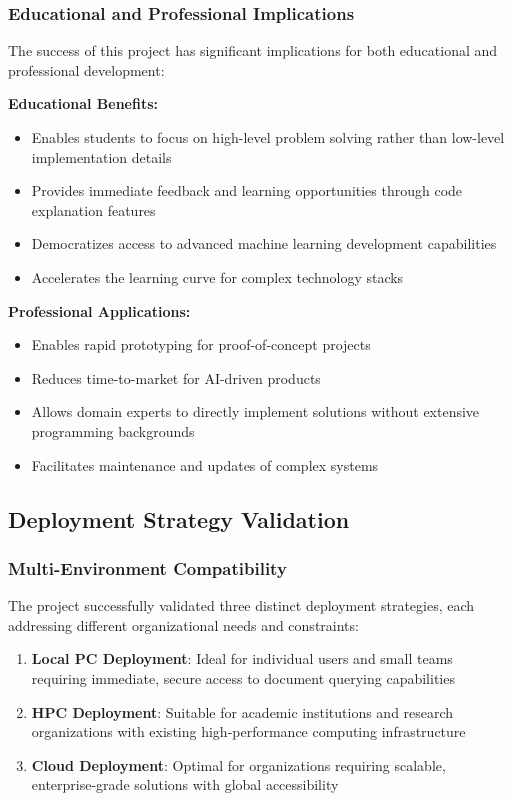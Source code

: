 \subsubsection{Educational and Professional Implications}

The success of this project has significant implications for both educational and professional development:

\textbf{Educational Benefits:}
\begin{itemize}
    \item Enables students to focus on high-level problem solving rather than low-level implementation details
    \item Provides immediate feedback and learning opportunities through code explanation features
    \item Democratizes access to advanced machine learning development capabilities
    \item Accelerates the learning curve for complex technology stacks
\end{itemize}

\textbf{Professional Applications:}
\begin{itemize}
    \item Enables rapid prototyping for proof-of-concept projects
    \item Reduces time-to-market for AI-driven products
    \item Allows domain experts to directly implement solutions without extensive programming backgrounds
    \item Facilitates maintenance and updates of complex systems
\end{itemize}

\subsection{Deployment Strategy Validation}

\subsubsection{Multi-Environment Compatibility}

The project successfully validated three distinct deployment strategies, each addressing different organizational needs and constraints:

\begin{enumerate}
    \item \textbf{Local PC Deployment}: Ideal for individual users and small teams requiring immediate, secure access to document querying capabilities
    \item \textbf{HPC Deployment}: Suitable for academic institutions and research organizations with existing high-performance computing infrastructure
    \item \textbf{Cloud Deployment}: Optimal for organizations requiring scalable, enterprise-grade solutions with global accessibility
\end{enumerate}

